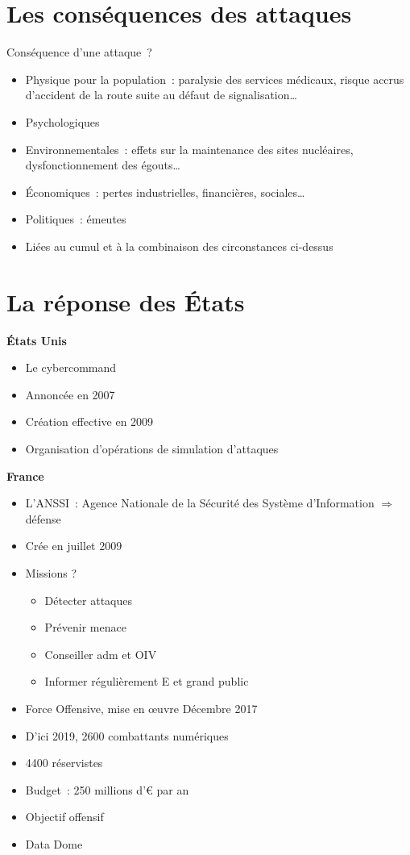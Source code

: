\documentclass[a4paper,11pt]{report}
\begin{document}
\section{Les conséquences des attaques}
Conséquence d’une attaque ?
\begin{itemize}
    \item Physique pour la population : paralysie des services médicaux, risque accrus d’accident de la route suite au défaut de signalisation…
    \item Psychologiques
    \item Environnementales : effets sur la maintenance des sites nucléaires, dysfonctionnement des égouts…
    \item Économiques : pertes industrielles, financières, sociales…
    \item Politiques : émeutes
    \item Liées au cumul et à la combinaison des circonstances ci-dessus
\end{itemize}
 
\section{La réponse des États}
\textbf{États Unis}
\begin{itemize}
    \item Le cybercommand\\
    \item Annoncée en 2007\\
    \item Création effective en 2009\\
    \item Organisation d’opérations de simulation d’attaques \\
\end{itemize}
  
\textbf{France}
\begin{itemize}
    \item L’ANSSI : Agence Nationale de la Sécurité des Système d’Information $\Rightarrow$ défense
    \item Crée en juillet 2009
    \item Missions ?
    \begin{itemize}
        \item Détecter attaques
        \item Prévenir menace
        \item Conseiller adm et OIV
        \item Informer régulièrement E et grand public
    \end{itemize}
    \item Force Offensive, mise en œuvre Décembre 2017
    \item D’ici 2019, 2600 combattants numériques
    \item 4400 réservistes
    \item Budget : 250 millions d’€ par an
    \item Objectif offensif
    \item Data Dome
\end{itemize}
\end{document}
